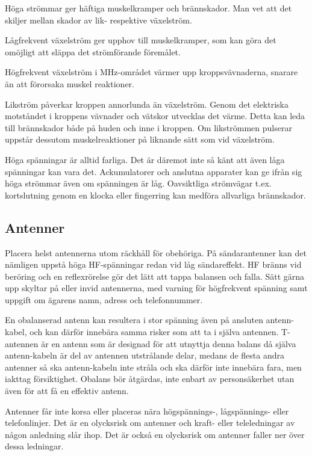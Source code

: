Höga strömmar ger häftiga muskelkramper och brännskador.
Man vet att det skiljer mellan skador av lik- respektive växelström.

Lågfrekvent växelström ger upphov till muskelkramper, som kan göra det
omöjligt att släppa det strömförande föremålet.

Högfrekvent växelström i MHz-området värmer upp kroppsvävnaderna,
snarare än att förorsaka muskel reaktioner.

Likström påverkar kroppen annorlunda än växelström.
Genom det elektriska motståndet i kroppens vävnader och vätskor utvecklas det
värme.
Detta kan leda till brännskador både på huden och inne i kroppen.
Om likströmmen pulserar uppstår dessutom muskelreaktioner på liknande sätt som
vid växelström.

Höga spänningar är alltid farliga.
Det är däremot inte så känt att även låga spänningar kan vara det.
Ackumulatorer och anslutna apparater kan ge ifrån sig höga strömmar även om
spänningen är låg.
Oavsiktliga strömvägar t.ex. kortslutning genom en klocka eller fingerring kan
medföra allvarliga brännskador.

\subsection{Antenner}

Placera helst antennerna utom räckhåll för obehöriga.
På sändarantenner kan det nämligen uppstå höga HF-spänningar redan vid
låg sändareffekt.
HF bränns vid beröring och en reflexrörelse gör det lätt att tappa balansen och
falla.
Sätt gärna upp skyltar på eller invid antennerna, med varning för högfrekvent
spänning samt uppgift om ägarens namn, adress och telefonnummer.

En obalanserad antenn kan resultera i stor spänning även på ansluten
antenn-kabel, och kan därför innebära samma risker som att ta i själva antennen.
T-antennen är en antenn som är designad för att utnyttja denna balans då själva
antenn-kabeln är del av antennen utstrålande delar, medans de flesta andra
antenner så ska antenn-kabeln inte stråla och ska därför inte innebära fara,
men iakttag försiktighet.
Obalans bör åtgärdas, inte enbart av personsäkerhet utan även för att få en
effektiv antenn.

Antenner får inte korsa eller placeras nära högspännings-, lågspännings- eller
telefonlinjer.
Det är en olycksrisk om antenner och kraft- eller teleledningar av någon
anledning slår ihop.
Det är också en olycksrisk om antenner faller ner över dessa ledningar.


